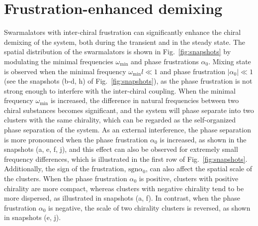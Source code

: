 \documentclass{article}
\begin{document}
\section{\label{sec:behaviors}Frustration-enhanced demixing}

Swarmalators with inter-chiral frustration can significantly enhance the chiral demixing of the system, both during the transient and in the steady state. 
The spatial distribution of the swarmalators is shown in Fig.~\ref{fig:snapshots} by modulating the minimal frequencies $\omega_{\min}$ and phase frustrations $\alpha_0$.
Mixing state is observed when the minimal frequency $\omega_{\min}l\ll1$ and phase frustration $\left|\alpha_0\right|\ll 1$ (see the snapshots (b-d, h) of Fig.~\ref{fig:snapshots}), as the phase frustration is not strong enough to interfere with the inter-chiral coupling. 
When the minimal frequency $\omega_{\min}$ is increased, the difference in natural frequencies between two chiral substances becomes significant, and the system will phase separate into two clusters with the same chirality, which can be regarded as the self-organized phase separation of the system. 
As an external interference, the phase separation is more pronounced when the phase frustration $\alpha_0$ is increased, as shown in the snapshots (a, e, f, j), and this effect can also be observed for extremely small frequency differences, which is illustrated in the first row of Fig.~\ref{fig:snapshots}. Additionally, the sign of the frustration, $\text{sgn}\alpha_0$, can also affect the spatial scale of the clusters.
When the phase frustration $\alpha_0$ is positive, clusters with positive chirality are more compact, whereas clusters with negative chirality tend to be more dispersed, as illustrated in snapshots (a, f). In contrast, when the phase frustration $\alpha_0$ is negative, the scale of two chirality clusters is reversed, as shown in snapshots (e, j).
\end{document}
